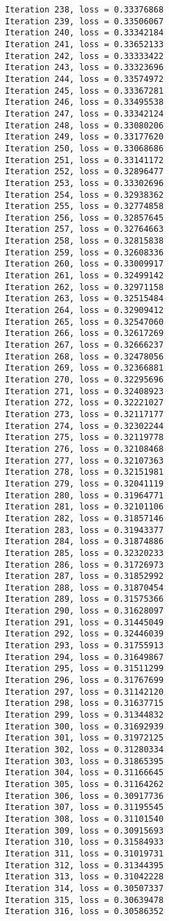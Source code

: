 \documentclass[11pt]{article}
\begin{document}
\begin{Verbatim}[commandchars=\\\{\}]
Iteration 238, loss = 0.33376868
Iteration 239, loss = 0.33506067
Iteration 240, loss = 0.33342184
Iteration 241, loss = 0.33652133
Iteration 242, loss = 0.33333422
Iteration 243, loss = 0.33323696
Iteration 244, loss = 0.33574972
Iteration 245, loss = 0.33367281
Iteration 246, loss = 0.33495538
Iteration 247, loss = 0.33342124
Iteration 248, loss = 0.33080206
Iteration 249, loss = 0.33177620
Iteration 250, loss = 0.33068686
Iteration 251, loss = 0.33141172
Iteration 252, loss = 0.32896477
Iteration 253, loss = 0.33302696
Iteration 254, loss = 0.32938362
Iteration 255, loss = 0.32774858
Iteration 256, loss = 0.32857645
Iteration 257, loss = 0.32764663
Iteration 258, loss = 0.32815838
Iteration 259, loss = 0.32608336
Iteration 260, loss = 0.33009917
Iteration 261, loss = 0.32499142
Iteration 262, loss = 0.32971158
Iteration 263, loss = 0.32515484
Iteration 264, loss = 0.32909412
Iteration 265, loss = 0.32547060
Iteration 266, loss = 0.32617269
Iteration 267, loss = 0.32666237
Iteration 268, loss = 0.32478056
Iteration 269, loss = 0.32366881
Iteration 270, loss = 0.32295696
Iteration 271, loss = 0.32408923
Iteration 272, loss = 0.32221027
Iteration 273, loss = 0.32117177
Iteration 274, loss = 0.32302244
Iteration 275, loss = 0.32119778
Iteration 276, loss = 0.32108468
Iteration 277, loss = 0.32107363
Iteration 278, loss = 0.32151981
Iteration 279, loss = 0.32041119
Iteration 280, loss = 0.31964771
Iteration 281, loss = 0.32101106
Iteration 282, loss = 0.31857146
Iteration 283, loss = 0.31943377
Iteration 284, loss = 0.31874886
Iteration 285, loss = 0.32320233
Iteration 286, loss = 0.31726973
Iteration 287, loss = 0.31852992
Iteration 288, loss = 0.31870454
Iteration 289, loss = 0.31575366
Iteration 290, loss = 0.31628097
Iteration 291, loss = 0.31445049
Iteration 292, loss = 0.32446039
Iteration 293, loss = 0.31755913
Iteration 294, loss = 0.31649867
Iteration 295, loss = 0.31511299
Iteration 296, loss = 0.31767699
Iteration 297, loss = 0.31142120
Iteration 298, loss = 0.31637715
Iteration 299, loss = 0.31344832
Iteration 300, loss = 0.31692939
Iteration 301, loss = 0.31972125
Iteration 302, loss = 0.31280334
Iteration 303, loss = 0.31865395
Iteration 304, loss = 0.31166645
Iteration 305, loss = 0.31164262
Iteration 306, loss = 0.30917736
Iteration 307, loss = 0.31195545
Iteration 308, loss = 0.31101540
Iteration 309, loss = 0.30915693
Iteration 310, loss = 0.31584933
Iteration 311, loss = 0.31019731
Iteration 312, loss = 0.31344395
Iteration 313, loss = 0.31042228
Iteration 314, loss = 0.30507337
Iteration 315, loss = 0.30639478
Iteration 316, loss = 0.30586352

\end{Verbatim}
\end{document}
